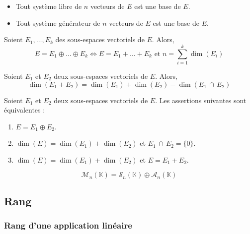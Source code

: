	\begin{proposition}
		\begin{itemize}
			\item Tout système libre de $n$ vecteurs de $E$ est une base de $E$.
			\item Tout système générateur de $n$ vecteurs de $E$ est une base de $E$.
		\end{itemize}
	\end{proposition}

	\begin{proposition}
		Soient $E_1, \dots, E_k$ des sous-espaces vectoriels de $E$. Alors,
		\[ E = E_1 \oplus \dots \oplus E_k \iff E = E_1 + \dots + E_k \text{ et } n = \sum_{i=1}^{k} \dim(E_i) \]
	\end{proposition}

	\begin{proposition}
		Soient $E_1$ et $E_2$ deux sous-espaces vectoriels de $E$. Alors,
		\[ \dim(E_1 + E_2) = \dim(E_1) + \dim(E_2) - \dim(E_1 \, \cap \, E_2) \]
	\end{proposition}

	\begin{corollary}
		Soient $E_1$ et $E_2$ deux sous-espaces vectoriels de $E$. Les assertions suivantes sont équivalentes :
		\begin{enumerate}[label=(\roman*)]
			\item $E = E_1 \oplus E_2$.
			\item $\dim(E) = \dim(E_1) + \dim(E_2)$ et $E_1 \, \cap \, E_2 = \{ 0 \}$.
			\item $\dim(E) = \dim(E_1) + \dim(E_2)$ et $E = E_1 + E_2$.
		\end{enumerate}
	\end{corollary}


	\begin{example}
		\[ \mathcal{M}_n(\mathbb{K}) = \mathcal{S}_n(\mathbb{K}) \oplus \mathcal{A}_n(\mathbb{K}) \]
	\end{example}

	\subsection{Rang}

	\subsubsection{Rang d'une application linéaire}

